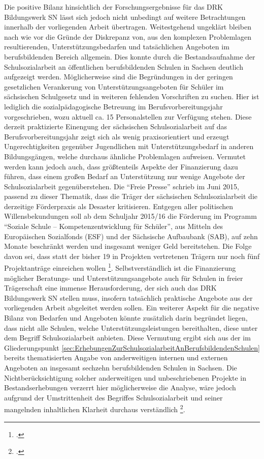 Die positive Bilanz hinsichtlich der Forschungsergebnisse für das DRK Bildungswerk SN lässt sich jedoch nicht unbedingt auf weitere Betrachtungen innerhalb der vorliegenden Arbeit übertragen. Weitestgehend ungeklärt bleiben nach wie vor die Gründe der Diskrepanz von, aus den komplexen Problemlagen resultierenden, Unterstützungsbedarfen und tatsächlichen Angeboten im berufsbildenden Bereich allgemein. Dies konnte durch die Bestandsaufnahme der Schulsozialarbeit an öffentlichen berufsbildenden Schulen in Sachsen deutlich aufgezeigt werden. Möglicherweise sind die Begründungen in der geringen gesetzlichen Verankerung von Unterstützungsangeboten für Schüler im sächsischen Schulgesetz und in weiteren fehlenden Vorschriften zu suchen. Hier ist lediglich die sozialpädagogische Betreuung im Berufsvorbereitungsjahr vorgeschrieben, wozu aktuell ca. 15 Personalstellen zur Verfügung stehen. Diese derzeit praktizierte Einengung der sächsischen Schulsozialarbeit auf das Berufsvorbereitungsjahr zeigt sich als wenig praxisorientiert und erzeugt Ungerechtigkeiten gegenüber Jugendlichen mit Unterstützungsbedarf in anderen Bildungsgängen, welche durchaus ähnliche Problemlagen aufweisen. Vermutet werden kann jedoch auch, dass größtenteils Aspekte der Finanzierung dazu führen, dass einem großen Bedarf an Unterstützung nur wenige Angebote der Schulsozialarbeit gegenüberstehen. Die "`Freie Presse"' schrieb im Juni 2015, passend zu dieser Thematik, dass die Träger der sächsischen Schulsozialarbeit die derzeitige Förderpraxis als Desaster kritisieren. Entgegen aller politischen Willensbekundungen soll ab dem Schuljahr 2015/16 die Förderung im Programm "`Soziale Schule -- Kompetenzentwicklung für Schüler"', aus Mitteln des Europäischen Sozialfonds (ESF) und der Sächsische Aufbaubank (SAB), auf zehn Monate beschränkt werden und insgesamt weniger Geld bereitstehen. Die Folge davon sei, dass statt der bisher 19 in Projekten vertretenen Trägern nur noch fünf Projektanträge einreichen wollen \footcite[vgl.]{FreiePresse2015}. Selbstverständlich ist die Finanzierung möglicher Beratungs- und Unterstützungsangebote auch für Schulen in freier Trägerschaft eine immense Herausforderung, der sich auch das DRK Bildungswerk SN stellen muss, insofern tatsächlich praktische Angebote aus der vorliegenden Arbeit abgeleitet werden sollen. Ein weiterer Aspekt für die negative Bilanz von Bedarfen und Angeboten könnte zusätzlich darin begründet liegen, dass nicht alle Schulen, welche Unterstützungsleistungen bereithalten, diese unter dem Begriff Schulsozialarbeit anbieten. Diese Vermutung ergibt sich aus der im Gliederungspunkt \ref{sec:ErhebungenZurSchulsozialarbeitAnBerufsbildendenSchulen} bereits thematisierten Angabe von anderweitigen internen und externen Angeboten an insgesamt sechzehn berufsbildenden Schulen in Sachsen. Die Nichtberücksichtigung solcher anderweitigen und unbeschriebenen Projekte in Bestandserhebungen verzerrt hier möglicherweise die Analyse, wäre jedoch aufgrund der Umstrittenheit des Begriffes Schulsozialarbeit und seiner mangelnden inhaltlichen Klarheit durchaus verständlich \footcite[vgl.][23]{Speck2007}.

